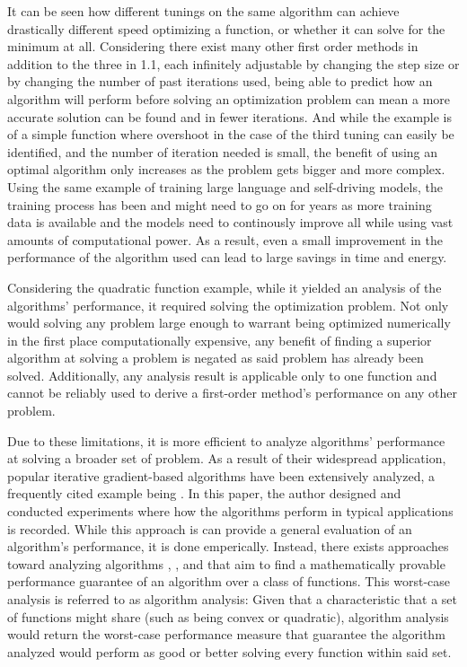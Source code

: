 It can be seen how different tunings on the same algorithm can achieve drastically different speed optimizing a function, or whether it can solve for the minimum at all. Considering there exist many other first order methods in addition to the three in 1.1, each infinitely adjustable by changing the step size or by changing the number of past iterations used, being able to predict how an algorithm will perform before solving an optimization problem can mean a more accurate solution can be found and in fewer iterations. And while the example is of a simple function where overshoot in the case of the third tuning can easily be identified, and the number of iteration needed is small, the benefit of using an optimal algorithm only increases as the problem gets bigger and more complex. Using the same example of training large language and self-driving models, the training process has been and might need to go on for years as more training data is available and the models need to continously improve all while using vast amounts of computational power. As a result, even a small improvement in the performance of the algorithm used can lead to large savings in time and energy.

Considering the quadratic function example, while it yielded an analysis of the algorithms' performance, it required solving the optimization problem. Not only would solving any problem large enough to warrant being optimized numerically in the first place computationally expensive, any benefit of finding a superior algorithm at solving a problem is negated as said problem has already been solved. Additionally, any analysis result is applicable only to one function and cannot be reliably used to derive a first-order method's performance on any other problem.

Due to these limitations, it is more efficient to analyze algorithms' performance at solving a broader set of problem. As a result of their widespread application, popular iterative gradient-based algorithms have been extensively analyzed, a frequently cited example being \cite{adam}. In this paper, the author designed and conducted experiments where how the algorithms perform in typical applications is recorded. While this approach is can provide a general evaluation of an algorithm's performance, it is done emperically. Instead, there exists approaches toward analyzing algorithms \cite{drori2012}, \cite{taylor2016}, and \cite{lessard2016} that aim to find a mathematically provable performance guarantee of an algorithm over a class of functions. This worst-case analysis is referred to as algorithm analysis: Given that a characteristic that a set of functions might share (such as being convex or quadratic), algorithm analysis would return the worst-case performance measure that guarantee the algorithm analyzed would perform as good or better solving every function within said set.

